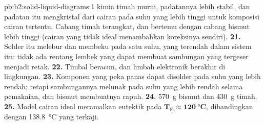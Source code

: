 \begin{solution}{pb:b2:solid-liquid-diagrams:1}
{kimia} timah murni, padatannya lebih stabil, dan padatan itu mengkristal
dari cairan pada suhu yang lebih tinggi untuk komposisi cairan tertentu.
Cabang timah  terangkat, dan bertemu dengan cabang bismut lebih
tinggi (cairan yang tidak ideal menambahkan koreksinya sendiri).
\textbf{21.} Solder itu melebur dan membeku pada satu suhu, yang terendah
dalam sistem itu: tidak ada rentang lembek yang dapat membuat sambungan
yang tergeser menjadi retak.
\textbf{22.} Timbal beracun, dan limbah elektronik berakhir di lingkungan.
\textbf{23.} Komponen yang peka panas dapat disolder pada suhu yang lebih
rendah; tetapi sambungannya melunak pada suhu yang lebih rendah selama
pemakaian, dan bismut membuatnya rapuh.
\textbf{24.} \qty{570}{g} bismut dan \qty{430}{g} timah.
\textbf{25.} Model cairan ideal meramalkan eutektik pada
$\boldsymbol{T_E
\approx \qty{120}{\degreeCelsius}}$, dibandingkan dengan
\qty{138.8}{\degreeCelsius} yang terkaji.
\end{solution}
